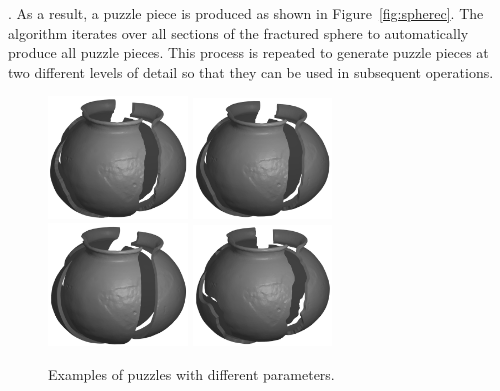\documentclass[acmlarge,screen,dvipsnames]{acmart}
\begin{document}
%
. As a result, a puzzle piece is
produced as shown in Figure~\ref{fig:spherec}.
%
The algorithm iterates over all sections of the fractured sphere to
automatically produce all puzzle pieces. This process is repeated to
generate puzzle pieces at two different levels of detail so that they
can be used in subsequent operations.
  
\begin{figure}[htb]    
     \centering
         {\includegraphics[width=0.33\textwidth]{images/pott1}}
        {\includegraphics[width=0.33\textwidth]{images/pott2}}
        {\includegraphics[width=0.33\textwidth]{images/pott3}}
        {\includegraphics[width=0.33\textwidth]{images/pott5}}
      \caption{\label{fig:pot-with-different-fracture-settings}%
        Examples of puzzles with different parameters.}
\end{figure}
\end{document}
